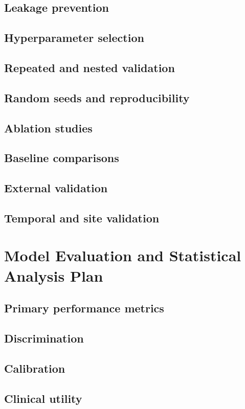 \documentclass[11pt,journal,onecolumn,draftclsnofoot]{IEEEtran}
\begin{document}
\subsection{Leakage prevention}
\subsection{Hyperparameter selection}
\subsection{Repeated and nested validation}
\subsection{Random seeds and reproducibility}
\subsection{Ablation studies}
\subsection{Baseline comparisons}
\subsection{External validation}
\subsection{Temporal and site validation}

\section{Model Evaluation and Statistical Analysis Plan}
\subsection{Primary performance metrics}
\subsection{Discrimination}
\subsection{Calibration}
\subsection{Clinical utility}
\end{document}
